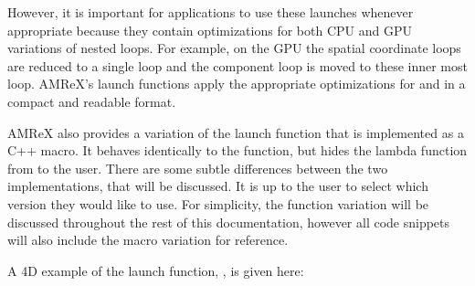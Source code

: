 \documentclass[letterpaper,10pt,english]{sphinxmanual}
\begin{document}
\sphinxAtStartPar
However, it is important for applications to use these launches whenever appropriate
because they contain optimizations for both CPU and GPU variations of nested
loops.  For example, on the GPU the spatial coordinate loops are reduced to a single
loop and the component loop is moved to these inner most loop.  AMReX’s launch functions
apply the appropriate optimizations for  and  in a
compact and readable format.

\sphinxAtStartPar
AMReX also provides a variation of the launch function that is implemented as a
C++ macro.  It behaves identically to the function, but hides the lambda function
from to the user.  There are some subtle differences between the two implementations,
that will be discussed.  It is up to the user to select which version they would like
to use.  For simplicity, the function variation will be discussed throughout the rest of
this documentation, however all code snippets will also include the macro variation
for reference.

\sphinxAtStartPar
A 4D example of the launch function, , is given here:

\begin{sphinxVerbatim}[commandchars=\\\{\}]
   
    
        
        

     
    \PYG{p}{[}\PYG{p}{]}         
          

\end{sphinxVerbatim}
\end{document}
